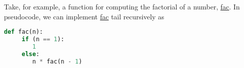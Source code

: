 Take, for example, a function for computing the factorial of a number, \uline{fac}. In pseudocode, we can implement \uline{fac} tail recursively as
\begin{lstlisting}[language=Python]
  def fac(n):
     if (n == 1):
        1
     else:
        n * fac(n - 1)
\end{lstlisting}
